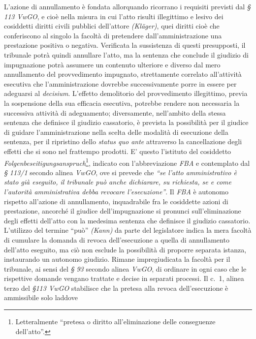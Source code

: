 \documentclass[12pt,it,a4paper,]{report}
\begin{document}
L'azione di annullamento è fondata allorquando ricorrano i requisiti
previsti dal \emph{§ 113 VwGO}, e cioè nella misura in cui l'atto
risulti illegittimo e lesivo dei cosiddetti diritti civili pubblici
dell'attore \emph{(Kläger)}, quei diritti cioè che conferiscono al
singolo la facoltà di pretendere dall'amministrazione una prestazione
positiva o negativa. Verificata la sussistenza di questi presupposti, il
tribunale potrà quindi annullare l'atto, ma la sentenza che conclude il
giudizio di impugnazione potrà assumere un contenuto ulteriore e diverso
dal mero annullamento del provvedimento impugnato, strettamente
correlato all'attività esecutiva che l'amministrazione dovrebbe
successivamente porre in essere per adeguarsi al \emph{decisium}.
L'effetto demolitorio del provvedimento illegittimo, previa la
sospensione della sua efficacia esecutiva, potrebbe rendere non
necessaria la successiva attività di adeguamento; diversamente,
nell'ambito della stessa sentenza che definisce il giudizio cassatorio,
è prevista la possibilità per il giudice di guidare l'amministrazione
nella scelta delle modalità di esecuzione della sentenza, per il
ripristino dello \emph{status quo ante} attraverso la cancellazione
degli effetti che si sono nel frattempo prodotti. E' questo l'istituto
del cosiddetto \emph{Folgenbeseitigungsanspruch}\footnote{Letteralmente
  ``pretesa o diritto all'eliminazione delle conseguenze dell'atto''.},
indicato con l'abbreviazione \emph{FBA} e contemplato dal \emph{§ 113/1}
secondo alinea \emph{VwGO}, ove si prevede che \emph{``se l'atto
amministrativo è stato già eseguito, il tribunale può anche dichiarare,
su richiesta, se e come l'autorità amministrativa debba revocare
l'esecuzione''}. Il \emph{FBA} è autonomo rispetto all'azione di
annullamento, inquadrabile fra le cosiddette azioni di prestazione,
ancorché il giudice dell'impugnazione si pronunci sull'eliminazione
degli effetti dell'atto con la medesima sentenza che definisce il
giudizio cassatorio. L'utilizzo del termine ``può'' \emph{(Kann)} da
parte del legislatore indica la mera facoltà di cumulare la domanda di
revoca dell'esecuzione a quella di annullamento dell'atto eseguito, ma
ciò non esclude la possibilità di proporre separata istanza, instaurando
un autonomo giudizio. Rimane impregiudicata la facoltà per il tribunale,
ai sensi del \emph{§ 93} secondo alinea \emph{VwGO}, di ordinare in ogni
caso che le rispettive domande vengano trattate e decise in separati
processi. Il c.~1, alinea terzo del \emph{§113 VwGO} stabilisce che la
pretesa alla revoca dell'esecuzione è ammissibile solo laddove
\end{document}
